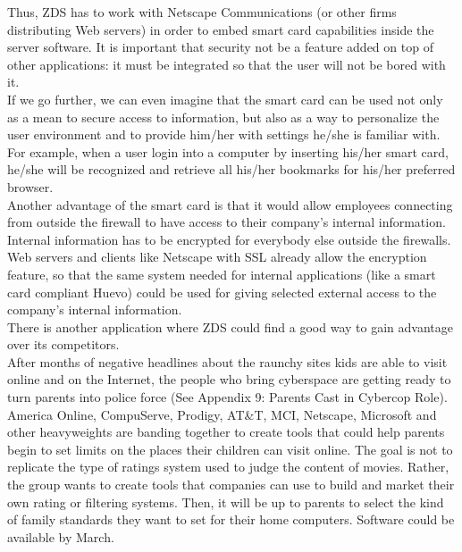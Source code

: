 Thus, ZDS has to work with Netscape Communications (or other firms
distributing Web servers) in order to embed smart card capabilities
inside the server software. It is important that security not be a
feature added on top of other applications: it must be integrated so
that the user will not be bored with it.\\

If we go further, we can even imagine that the smart card can be used
not only as a mean to secure access to information, but also as a way
to personalize the user environment and to provide him/her with
settings he/she is familiar with. For example, when a user login into a
computer by inserting his/her smart card, he/she will be recognized and
retrieve all his/her bookmarks for his/her preferred browser.\\

Another advantage of the smart card is that it would allow employees
connecting from outside the firewall to have access to their company's
internal information. Internal information has to be encrypted for
everybody else outside the firewalls. Web servers and clients like
Netscape with SSL already allow the encryption feature, so that the
same system needed for internal applications (like a smart card
compliant Huevo) could be used for giving selected external access to
the company's internal information.\\

There is another application where ZDS could find a good way to gain
advantage over its competitors.\\

After months of negative headlines about the raunchy sites kids are
able to visit online and on the Internet, the people who bring
cyberspace are getting ready to turn parents into police force (See
Appendix 9: Parents Cast in Cybercop Role). America Online, CompuServe,
Prodigy, AT\&T, MCI, Netscape, Microsoft and other heavyweights are
banding together to create tools that could help parents begin to set
limits on the places their children can visit online. The goal is not
to replicate the type of ratings system used to judge the content of
movies. Rather, the group wants to create tools that companies can use
to build and market their own rating or filtering systems. Then, it
will be up to parents to select the kind of family standards they want
to set for their home computers. Software could be available by March.\\

